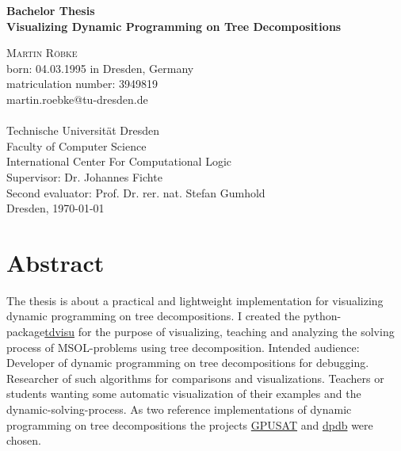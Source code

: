 \documentclass[a4paper, 12pt]{scrartcl}
\begin{document}
\begin{titlepage}
	\begin{center}
		{\Large\bfseries Bachelor Thesis}           \\[6.5ex]
		
		{\huge\bfseries Visualizing Dynamic Programming on Tree Decompositions}                  \\[6.5ex]
		
		\vspace{6ex}
				
		\textsc{\Large Martin Röbke}    \\[3ex]
		{\Large born: 04.03.1995 in Dresden, Germany}    \\[2ex]
		{\Large matriculation number: 3949819}    \\[2ex]
		{\Large martin.roebke@tu-dresden.de}    \\[2ex]
		\textsc{\large 
			}             \\[12ex]
		\vfill
		{\Large Technische Universität Dresden}               \\
		Faculty of Computer Science \\
		International Center For Computational Logic 		\\[5ex]
		
		{\Large Supervisor: Dr. Johannes Fichte}\\[2ex]
		{\Large Second evaluator:  Prof. Dr. rer. nat. Stefan Gumhold}\\[5ex]
		
		\vfill
		Dresden, \today
	\end{center}
\end{titlepage}


\section*{Abstract}
\vspace{4ex}
The thesis is about a practical and lightweight implementation for visualizing dynamic programming on tree decompositions.
I created the python-package\href{https://pypi.org/project/tdvisu}{tdvisu} for the purpose of visualizing, teaching and analyzing the solving process of MSOL-problems using tree decomposition. 
Intended audience: Developer of dynamic programming on tree decompositions for debugging. Researcher of such algorithms for comparisons and visualizations.
Teachers or students wanting some automatic visualization of their examples and the dynamic-solving-process.
As two reference implementations of dynamic programming on tree decompositions the projects \href{https://github.com/daajoe/GPUSAT}{GPUSAT} and \href{https://github.com/hmarkus/dp_on_dbs}{dpdb} were chosen.
\end{document}
